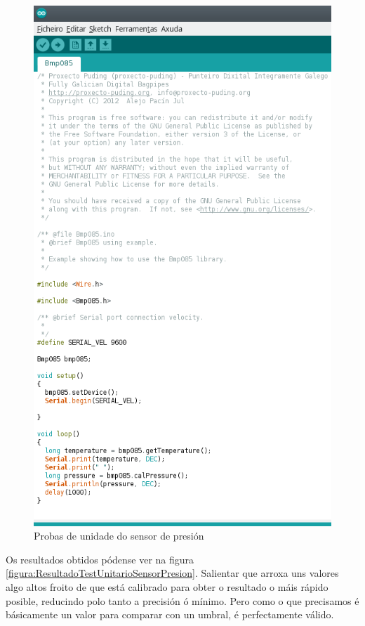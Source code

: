   \begin{figure}[htbp]
   \centering
   \includegraphics[scale=0.8,keepaspectratio=true]{./imagenes/test-sensor-presion.png}
   \caption{Probas de unidade do sensor de presión}
   \label{figura:TestUnitarioSensorPresion}
  \end{figure}
  
  Os resultados obtidos pódense ver na figura
  \ref{figura:ResultadoTestUnitarioSensorPresion}. Salientar que arroxa uns
  valores algo altos froito de que está calibrado para obter o resultado o máis
  rápido posible, reducindo polo tanto a precisión ó mínimo. Pero como o que
  precisamos é básicamente un valor para comparar con un umbral, é perfectamente
  válido. \\
  
